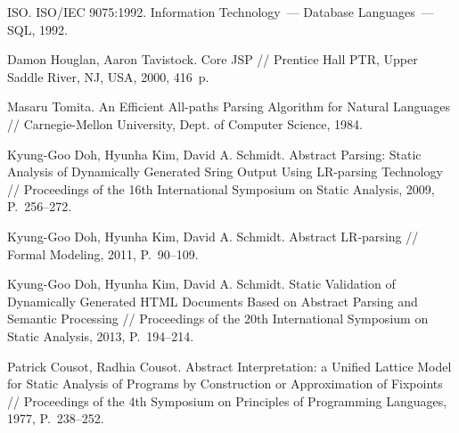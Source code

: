 \documentclass{llncs}
\begin{document}
\begin{thebibliography}{}
ISO. ISO/IEC 9075:1992. Information Technology~--- Database Languages~--- SQL, 1992.

Damon Houglan, Aaron Tavistock. Core JSP // Prentice Hall PTR, Upper Saddle River, NJ, USA, 2000, 416~p.

Masaru Tomita.
An Efficient All-paths Parsing Algorithm for Natural Languages //
Carnegie-Mellon University, Dept. of Computer Science, 1984.

Kyung-Goo Doh, Hyunha Kim, David A. Schmidt. Abstract Parsing: Static Analysis of 
Dynamically Generated Sring Output Using LR-parsing Technology // 
Proceedings of the 16th International Symposium on Static Analysis, 2009, P.~256--272.

Kyung-Goo Doh, Hyunha Kim, David A. Schmidt. Abstract LR-parsing // Formal Modeling, 2011, P.~90--109.

Kyung-Goo Doh, Hyunha Kim, David A. Schmidt. Static Validation of Dynamically Generated HTML 
Documents Based on Abstract Parsing and Semantic Processing // 
Proceedings of the 20th International Symposium on Static Analysis, 2013, P.~194--214.

Patrick Cousot, Radhia Cousot. Abstract Interpretation: a Unified Lattice Model for Static Analysis 
of Programs by Construction or Approximation of Fixpoints // Proceedings of the 4th Symposium on Principles of Programming Languages, 1977, P.~238--252.

\end{thebibliography}


\end{document}
